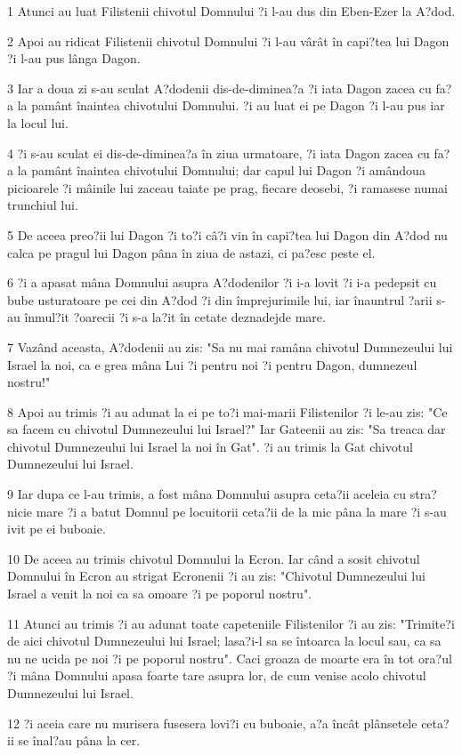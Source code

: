 \par 1 Atunci au luat Filistenii chivotul Domnului ?i l-au dus din Eben-Ezer la A?dod.
\par 2 Apoi au ridicat Filistenii chivotul Domnului ?i l-au vârât în capi?tea lui Dagon ?i l-au pus lânga Dagon.
\par 3 Iar a doua zi s-au sculat A?dodenii dis-de-diminea?a ?i iata Dagon zacea cu fa?a la pamânt înaintea chivotului Domnului. ?i au luat ei pe Dagon ?i l-au pus iar la locul lui.
\par 4 ?i s-au sculat ei dis-de-diminea?a în ziua urmatoare, ?i iata Dagon zacea cu fa?a la pamânt înaintea chivotului Domnului; dar capul lui Dagon ?i amândoua picioarele ?i mâinile lui zaceau taiate pe prag, fiecare deosebi, ?i ramasese numai trunchiul lui.
\par 5 De aceea preo?ii lui Dagon ?i to?i câ?i vin în capi?tea lui Dagon din A?dod nu calca pe pragul lui Dagon pâna în ziua de astazi, ci pa?esc peste el.
\par 6 ?i a apasat mâna Domnului asupra A?dodenilor ?i i-a lovit ?i i-a pedepsit cu bube usturatoare pe cei din A?dod ?i din împrejurimile lui, iar înauntrul ?arii s-au înmul?it ?oarecii ?i s-a la?it în cetate deznadejde mare.
\par 7 Vazând aceasta, A?dodenii au zis: "Sa nu mai ramâna chivotul Dumnezeului lui Israel la noi, ca e grea mâna Lui ?i pentru noi ?i pentru Dagon, dumnezeul nostru!"
\par 8 Apoi au trimis ?i au adunat la ei pe to?i mai-marii Filistenilor ?i le-au zis: "Ce sa facem cu chivotul Dumnezeului lui Israel?" Iar Gateenii au zis: "Sa treaca dar chivotul Dumnezeului lui Israel la noi în Gat". ?i au trimis la Gat chivotul Dumnezeului lui Israel.
\par 9 Iar dupa ce l-au trimis, a fost mâna Domnului asupra ceta?ii aceleia cu stra?nicie mare ?i a batut Domnul pe locuitorii ceta?ii de la mic pâna la mare ?i s-au ivit pe ei buboaie.
\par 10 De aceea au trimis chivotul Domnului la Ecron. Iar când a sosit chivotul Domnului în Ecron au strigat Ecronenii ?i au zis: "Chivotul Dumnezeului lui Israel a venit la noi ca sa omoare ?i pe poporul nostru".
\par 11 Atunci au trimis ?i au adunat toate capeteniile Filistenilor ?i au zis: "Trimite?i de aici chivotul Dumnezeului lui Israel; lasa?i-l sa se întoarca la locul sau, ca sa nu ne ucida pe noi ?i pe poporul nostru". Caci groaza de moarte era în tot ora?ul ?i mâna Domnului apasa foarte tare asupra lor, de cum venise acolo chivotul Dumnezeului lui Israel.
\par 12 ?i aceia care nu murisera fusesera lovi?i cu buboaie, a?a încât plânsetele ceta?ii se înal?au pâna la cer.


